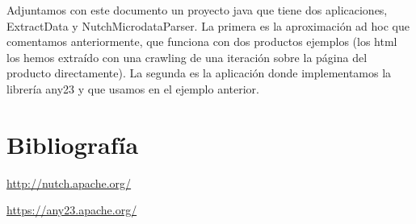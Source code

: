 \documentclass[a4paper]{article}
\begin{document}
Adjuntamos con este documento un proyecto java que tiene dos aplicaciones, ExtractData y NutchMicrodataParser. La primera es la aproximación ad hoc que comentamos anteriormente, que funciona con dos productos ejemplos (los html los hemos extraído con una crawling de una iteración sobre la página del producto directamente). La segunda es la aplicación donde implementamos la librería any23 y que usamos en el ejemplo anterior.

\section{Bibliografía}

\url{http://nutch.apache.org/}

\url{https://any23.apache.org/}
\end{document}
